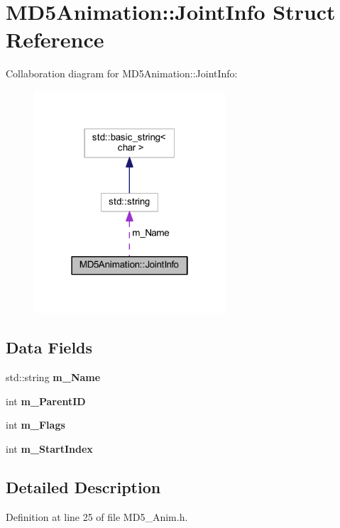\hypertarget{struct_m_d5_animation_1_1_joint_info}{}\section{M\+D5\+Animation\+:\+:Joint\+Info Struct Reference}
\label{struct_m_d5_animation_1_1_joint_info}


Collaboration diagram for M\+D5\+Animation\+:\+:Joint\+Info\+:
\nopagebreak
\begin{figure}[H]
\begin{center}
\leavevmode
\includegraphics[width=202pt]{struct_m_d5_animation_1_1_joint_info__coll__graph}
\end{center}
\end{figure}
\subsection*{Data Fields}
\begin{DoxyCompactItemize}
\item 
std\+::string {\bfseries m\+\_\+\+Name}\hypertarget{struct_m_d5_animation_1_1_joint_info_a96689c5c43ab55c4ea81ad9cf45a71b2}{}\label{struct_m_d5_animation_1_1_joint_info_a96689c5c43ab55c4ea81ad9cf45a71b2}

\item 
int {\bfseries m\+\_\+\+Parent\+ID}\hypertarget{struct_m_d5_animation_1_1_joint_info_aa6e4fd111213167c87341bfb04a7bb8b}{}\label{struct_m_d5_animation_1_1_joint_info_aa6e4fd111213167c87341bfb04a7bb8b}

\item 
int {\bfseries m\+\_\+\+Flags}\hypertarget{struct_m_d5_animation_1_1_joint_info_af17256b6479a8888116cc8e62b3844d0}{}\label{struct_m_d5_animation_1_1_joint_info_af17256b6479a8888116cc8e62b3844d0}

\item 
int {\bfseries m\+\_\+\+Start\+Index}\hypertarget{struct_m_d5_animation_1_1_joint_info_af95e9e7800f0a4dafe62b86cf60efb46}{}\label{struct_m_d5_animation_1_1_joint_info_af95e9e7800f0a4dafe62b86cf60efb46}

\end{DoxyCompactItemize}


\subsection{Detailed Description}


Definition at line 25 of file M\+D5\+\_\+\+Anim.\+h.

